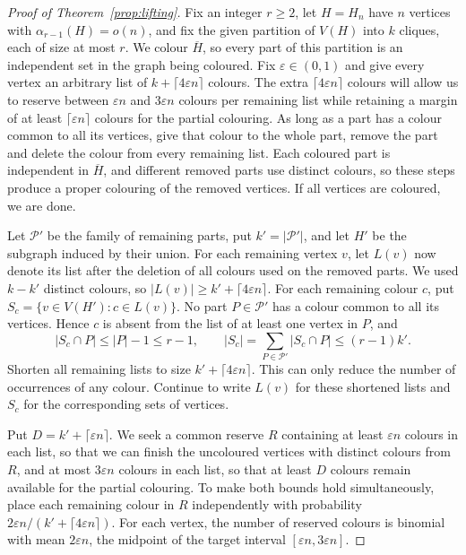 \documentclass[11pt]{article}
\numberwithin{equation}{section}
\newcommand{\ov}[1]{\overline{#1}}
\begin{document}
\begin{proof}[Proof of Theorem~\ref{prop:lifting}]
  
Fix an integer $r\ge2$, let $H=H_n$ have $n$ vertices with $\alpha_{r-1}(H)=o(n)$, and fix the given partition of $V(H)$ into $k$ cliques, each of size at most $r$. We colour $\ov H$, so every part of this partition is an independent set in the graph being coloured. Fix $\varepsilon\in(0,1)$ and give every vertex an arbitrary list of $k+\lceil4\varepsilon n\rceil$ colours. The extra $\lceil4\varepsilon n\rceil$ colours will allow us to reserve between $\varepsilon n$ and $3\varepsilon n$ colours per remaining list while retaining a margin of at least $\lceil\varepsilon n\rceil$ colours for the partial colouring. As long as a part has a colour common to all its vertices, give that colour to the whole part, remove the part and delete the colour from every remaining list. Each coloured part is independent in $\ov H$, and different removed parts use distinct colours, so these steps produce a proper colouring of the removed vertices. If all vertices are coloured, we are done.
 

  
Let $\mathcal P'$ be the family of remaining parts, put $k'=|\mathcal P'|$, and let $H'$ be the subgraph induced by their union. For each remaining vertex $v$, let $L(v)$ now denote its list after the deletion of all colours used on the removed parts. We used $k-k'$ distinct colours, so $|L(v)|\ge k'+\lceil4\varepsilon n\rceil$. For each remaining colour $c$, put $S_c=\{v\in V(H'):c\in L(v)\}$. No part $P\in\mathcal P'$ has a colour common to all its vertices. Hence $c$ is absent from the list of at least one vertex in $P$, and
\[
 |S_c\cap P|\le |P|-1\le r-1,
 \qquad
 |S_c|=\sum_{P\in\mathcal P'}|S_c\cap P|
       \le(r-1)k'.
\]
Shorten all remaining lists to size $k'+\lceil4\varepsilon n\rceil$. This can only reduce the number of occurrences of any colour. Continue to write $L(v)$ for these shortened lists and $S_c$ for the corresponding sets of vertices.
 

  
Put $D=k'+\lceil\varepsilon n\rceil$. We seek a common reserve $R$ containing at least $\varepsilon n$ colours in each list, so that we can finish the uncoloured vertices with distinct colours from $R$, and at most $3\varepsilon n$ colours in each list, so that at least $D$ colours remain available for the partial colouring. To make both bounds hold simultaneously, place each remaining colour in $R$ independently with probability $2\varepsilon n/(k'+\lceil4\varepsilon n\rceil)$. For each vertex, the number of reserved colours is binomial with mean $2\varepsilon n$, the midpoint of the target interval $[\varepsilon n,3\varepsilon n]$.
 

\end{proof}
\end{document}
